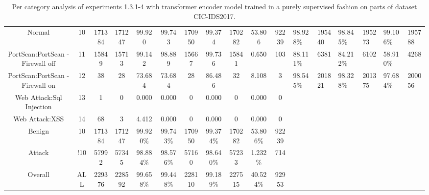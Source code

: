 \begin{table}[htb]
\begin{tabular}{@{}ccccccccccc@{}}
        Normal &  10 &  171384 &  171247 &  99.920 &  99.743 &  170950 &  99.374 &  170282 &  53.806 &  92239 &  98.928\% &  195440 &  98.845\% &  195273 &  99.106\% &  195788 \\
        PortScan:PortScan - Firewall off &  11 &  15849 &  15713 &  99.142 &  98.889 &  15667 &  99.736 &  15841 &  0.650 &  103 &  88.111\% &  6381 &  84.212\% &  6102 &  58.910\% &  4268 \\
        PortScan:PortScan - Firewall on &  12 &  38 &  28 &  73.684 &  73.684 &  28 &  86.486 &  32 &  8.108 &  3 &  98.545\% &  201821 &  98.328\% &  201375 &  97.684\% &  200056 \\
        Web Attack:Sql Injection &  13 &  1 &  0 &  0.000 &  0.000 &  0 &  0.000 &  0 &  0.000 &  0 \\
        Web Attack:XSS &  14 &  68 &  3 &  4.412 &  0.000 &  0 &  0.000 &  0 &  0.000 &  0 \\
        Benign &  10 &  171384 &  171247 &  99.920\% &  99.743\% &  170950 &  99.374\% &  170282 &  53.806\% &  92239 \\
        Attack &  !10 &  57992 &  57345 &  98.884\% &  98.576\% &  57160 &  98.640\% &  57233 &  1.232\% &  714 \\
        Overall &  ALL &  229376 &  228592 &  99.658\% &  99.448\% &  228110 &  99.189\% &  227515 &  40.524\% &  92953 \\
        \bottomrule
    \end{tabular}
    \caption{Per category analysis of experiments 1.3.1-4 with transformer encoder model trained in a purely supervised fashion on parts of dataset CIC-IDS2017.}
    \label{table:results:lstm:class_flows_supervised}
\end{table}